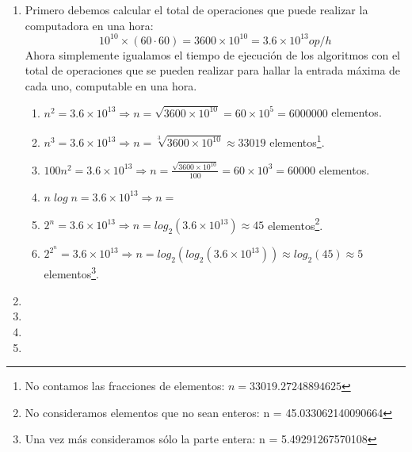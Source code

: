\documentclass[12pt]{article}
\newenvironment{boenumerate}
               {\begin{enumerate}\renewcommand\labelenumi{\textbf{\theenumi.}}}
               {\end{enumerate}}
\begin{document}
\begin{boenumerate}
\begin{enumerate}
\begin{enumerate}
      Por lo que el nuevo tiempo será la potencia cuadrada del original.
    \item Con $n+1$ de entrada:
      \begin{align}
        2^{(n+1)} = 2 \cdot 2^n
      \end{align}
      Aumenta al doble del original.
    \end{enumerate}
  \end{enumerate}
\item
  Primero debemos calcular el total de operaciones que puede realizar la computadora en una hora:
  \begin{equation}
    10^{10} \times (60 \cdot 60) = 3600 \times 10^{10} = 3.6 \times 10^{13} op/h
  \end{equation}
  Ahora simplemente igualamos el tiempo de ejecución de los algoritmos con el total de operaciones
  que se pueden realizar para hallar la entrada máxima de cada uno, computable en una hora.
  \begin{enumerate}
  \item $n^2 = 3.6 \times 10^{13} \Rightarrow n = \sqrt{3600 \times 10^{10}} = 60 \times 10^{5} = 6000000$ elementos.
  \item $n^3 = 3.6 \times 10^{13} \Rightarrow n = \sqrt[3]{3600 \times 10^{10}} \approx 33019$ elementos\footnote{No contamos las fracciones de elementos: $n = 33019.27248894625$}.
  \item $100n^2 = 3.6 \times 10^{13} \Rightarrow n = \frac{\sqrt{3600 \times 10^{10}}}{100} = 60 \times 10^{3} = 60000$ elementos.
  \item $n\;log\;n = 3.6 \times 10^{13} \Rightarrow n = $
  \item $2^n = 3.6 \times 10^{13} \Rightarrow n = log_2(3.6 \times 10^{13}) \approx 45$ elementos\footnote{No consideramos elementos que no sean enteros: n = 45.033062140090664}.
  \item $2^{2^n} = 3.6 \times 10^{13} \Rightarrow n = log_2(log_2(3.6 \times 10^{13})) \approx log_2(45) \approx 5$ elementos\footnote{Una vez más consideramos sólo la parte entera: n = 5.49291267570108}.
  \end{enumerate}
\item
\item
\item
\item
\end{boenumerate}
\end{document}
